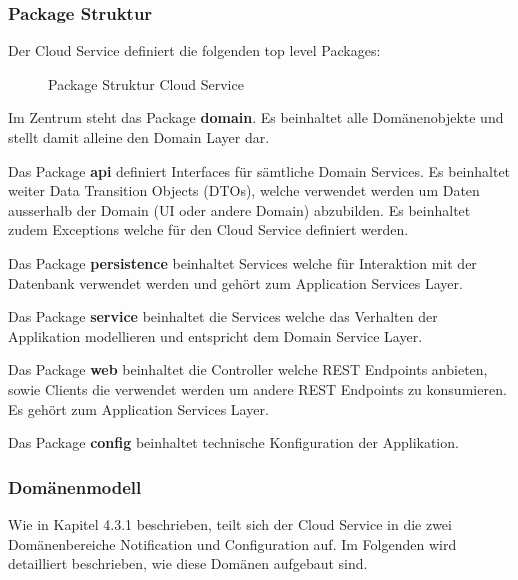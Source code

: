 \clearpage

\subsubsection*{Package Struktur}

Der Cloud Service definiert die folgenden top level Packages:

\begin{figure}[h]
    \centering
    \begin{minipage}[b]{0.9\textwidth}

    \caption{Package Struktur Cloud Service}\label{fig:packagescloudservice}
    \end{minipage}
\end{figure}



Im Zentrum steht das Package \textbf{domain}.
Es beinhaltet alle Domänenobjekte und stellt damit alleine den Domain Layer dar.

Das Package \textbf{api} definiert Interfaces für sämtliche Domain Services.
Es beinhaltet weiter Data Transition Objects (DTOs), welche verwendet werden um Daten ausserhalb der Domain (UI oder andere Domain) abzubilden.
Es beinhaltet zudem Exceptions welche für den Cloud Service definiert werden.

Das Package \textbf{persistence} beinhaltet Services welche für Interaktion mit der Datenbank verwendet werden und  gehört zum Application Services Layer.

Das Package \textbf{service} beinhaltet die Services welche das Verhalten der Applikation modellieren und entspricht dem Domain Service Layer.

Das Package \textbf{web} beinhaltet die Controller welche REST Endpoints anbieten, sowie Clients die verwendet werden um andere REST Endpoints zu konsumieren.
Es gehört zum Application Services Layer.

Das Package \textbf{config} beinhaltet technische Konfiguration der Applikation.


\clearpage

\subsubsection{Domänenmodell}

Wie in Kapitel 4.3.1 beschrieben, teilt sich der Cloud Service in die zwei Domänenbereiche Notification und Configuration auf.
Im Folgenden wird detailliert beschrieben, wie diese Domänen aufgebaut sind.

